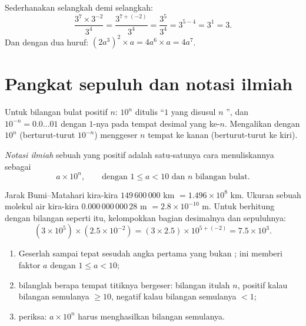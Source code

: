 \begin{example}\label{ex:g9:fractions:rules}
Sederhanakan selangkah demi selangkah:
\[
\frac{3^7 \times 3^{-2}}{3^4}
= \frac{3^{7 + (-2)}}{3^4}
= \frac{3^5}{3^4}
= 3^{5-4} = 3^1 = 3 .
\]
Dan dengan dua huruf: $(2a^3)^2 \times a = 4 a^6 \times a = 4a^7$.
\end{example}

\section{Pangkat sepuluh dan notasi ilmiah}

\begin{proposition}\label{prop:g9:fractions:ten}
Untuk bilangan bulat positif $n$: $10^n$ ditulis ``$1$ yang disusul
$n$ '', dan $10^{-n} = 0.0\dots01$ dengan $1$-nya pada tempat
desimal yang ke-$n$. Mengalikan  dengan $10^n$
(berturut-turut $10^{-n}$) menggeser  $n$ tempat ke
kanan (berturut-turut ke kiri).
\end{proposition}

\begin{definition}\label{def:g9:fractions:scientific}
\emph{Notasi ilmiah} sebuah  yang
positif adalah satu-satunya cara menuliskannya sebagai
\[
a \times 10^n,
\qquad\text{dengan } 1 \leq a < 10 \text{ dan } n \text{ bilangan bulat.}
\]
\end{definition}

\begin{example}\label{ex:g9:fractions:scientific}
Jarak Bumi--Matahari kira-kira $149\,600\,000$ km $= 1.496 \times
10^8$ km. Ukuran sebuah molekul air kira-kira
$0.000\,000\,000\,28$ m $= 2.8 \times 10^{-10}$ m. Untuk berhitung
dengan bilangan seperti itu, kelompokkan bagian desimalnya dan 
sepuluhnya:
\[
(3 \times 10^5) \times (2.5 \times 10^{-2})
= (3 \times 2.5) \times 10^{5 + (-2)}
= 7.5 \times 10^{3}.
\]
\end{example}

\begin{method}\label{met:g9:fractions:scientific}
\begin{enumerate}
  \item Geserlah  sampai tepat sesudah angka
        pertama yang bukan ; ini memberi faktor $a$ dengan
        $1 \leq a < 10$;
  \item bilanglah berapa tempat titiknya bergeser: bilangan itulah
        $n$, positif kalau bilangan semulanya $\geq 10$, negatif
        kalau bilangan semulanya $< 1$;
  \item periksa: $a \times 10^n$ harus menghasilkan bilangan semulanya.
\end{enumerate}
\end{method}

